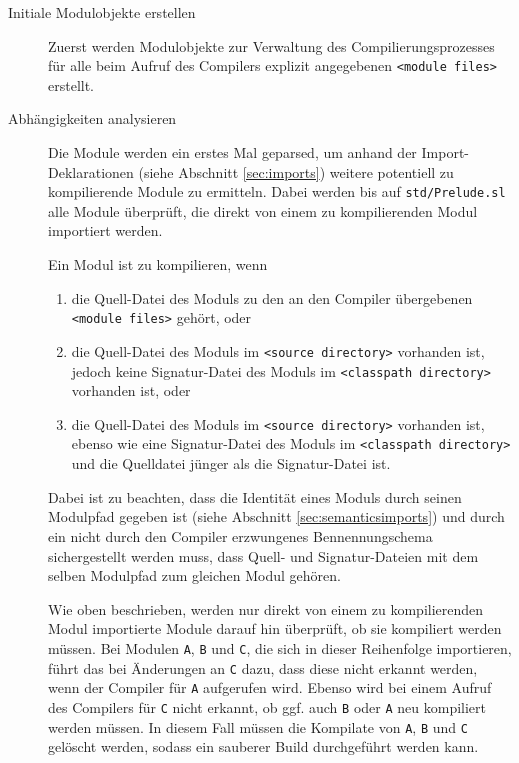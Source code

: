 \documentclass[runningheads]{llncs}
\begin{document}
\begin{description}
\item[Initiale Modulobjekte erstellen] Zuerst werden Modulobjekte zur Verwaltung
    des Compilierungsprozesses für alle beim Aufruf des Compilers
    explizit angegebenen \texttt{<module files>} erstellt.
\item[Abhängigkeiten analysieren] 
    Die Module werden ein erstes Mal geparsed, um anhand der
    Import-Deklarationen (siehe Abschnitt \ref{sec:imports}) weitere
    potentiell zu kompilierende Module zu ermitteln. Dabei werden bis
    auf \texttt{std/Prelude.sl} alle Module überprüft, die direkt von
    einem zu kompilierenden Modul importiert werden.
    
    Ein Modul ist zu kompilieren, wenn
    \begin{enumerate}
    \item die Quell-Datei des Moduls zu den an den Compiler
        übergebenen \texttt{<module files>} gehört, oder
    \item die Quell-Datei des Moduls im \texttt{<source directory>}
        vorhanden ist, jedoch keine Signatur-Datei des Moduls im
        \texttt{<classpath directory>} vorhanden ist, oder
    \item die Quell-Datei des Moduls im \texttt{<source directory>}
        vorhanden ist, ebenso wie eine Signatur-Datei des Moduls im
        \texttt{<classpath directory>} und die Quelldatei jünger als
        die Signatur-Datei ist.
    \end{enumerate}
    Dabei ist zu beachten, dass die Identität eines Moduls durch seinen
    Modulpfad gegeben ist (siehe Abschnitt \ref{sec:semanticsimports}) und durch ein nicht
    durch den Compiler erzwungenes Bennennungschema sichergestellt
    werden muss, dass Quell- und Signatur-Dateien mit dem selben
    Modulpfad zum gleichen Modul gehören.
    
    Wie oben beschrieben, werden nur direkt von einem zu
    kompilierenden Modul importierte Module darauf hin überprüft,
    ob sie kompiliert werden müssen. Bei Modulen \texttt{A},
    \texttt{B} und \texttt{C}, die sich in dieser Reihenfolge
    importieren, führt das bei Änderungen an \texttt{C} dazu, dass
    diese nicht erkannt werden, wenn der Compiler für \texttt{A}
    aufgerufen wird. Ebenso wird bei einem Aufruf des Compilers für
    \texttt{C} nicht erkannt, ob ggf. auch \texttt{B} oder \texttt{A}
    neu kompiliert werden müssen. In diesem Fall müssen die Kompilate
    von \texttt{A}, \texttt{B} und \texttt{C} gelöscht werden, sodass
    ein sauberer Build durchgeführt werden kann.
    

\end{description}
\end{document}
